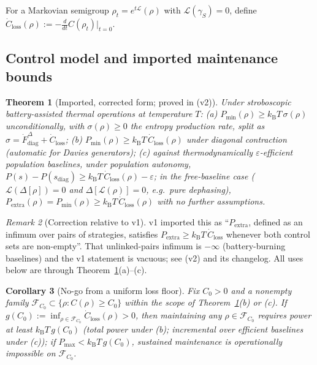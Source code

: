 \documentclass[11pt,a4paper]{article}
\theoremstyle{plain}
\newtheorem{theorem}{Theorem}[section]
\newtheorem{corollary}[theorem]{Corollary}
\theoremstyle{definition}
\theoremstyle{remark}
\newtheorem{remark}[theorem]{Remark}
\newcommand{\kB}{k_{\mathrm{B}}}
\begin{document}
For a Markovian semigroup $\rho_t = e^{t\mathcal{L}}(\rho)$ with
$\mathcal{L}(\gamma_S) = 0$, define $\dot{C}_{\mathrm{loss}}(\rho) :=
-\frac{d}{dt}C(\rho_t)|_{t=0}$.

\subsection{Control model and imported maintenance bounds}

\begin{theorem}[Imported, corrected form; proved in \cite{MaintWork} (v2)]
\label{thm:imported}
Under stroboscopic battery-assisted thermal operations at temperature $T$:
(a) $P_{\min}(\rho) \ge \kB T\,\sigma(\rho)$ unconditionally, with
$\sigma(\rho) \ge 0$ the entropy production rate, split as $\sigma =
\dot{F}^\Delta_{\mathrm{diag}} + \dot{C}_{\mathrm{loss}}$;
(b) $P_{\min}(\rho) \ge \kB T\,\dot{C}_{\mathrm{loss}}(\rho)$ under diagonal
contraction (automatic for Davies generators);
(c) against thermodynamically $\varepsilon$-efficient population baselines,
under population autonomy, $P(s) - P(s_{\mathrm{diag}}) \ge \kB
T\,\dot{C}_{\mathrm{loss}}(\rho) - \varepsilon$; in the free-baseline case
($\mathcal{L}(\Delta[\rho]) = 0$ and $\Delta[\mathcal{L}(\rho)] = 0$, e.g.\
pure dephasing), $P_{\mathrm{extra}}(\rho) = P_{\min}(\rho) \ge \kB
T\,\dot{C}_{\mathrm{loss}}(\rho)$ with no further assumptions.
\end{theorem}

\begin{remark}[Correction relative to v1]\label{rem:importfix}
v1 imported this as ``$P_{\mathrm{extra}}$, defined as an infimum over pairs
of strategies, satisfies $P_{\mathrm{extra}} \ge \kB
T\,\dot{C}_{\mathrm{loss}}$ whenever both control sets are non-empty''. That
unlinked-pairs infimum is $-\infty$ (battery-burning baselines) and the v1
statement is vacuous; see \cite{MaintWork} (v2) and its changelog. All uses
below are through Theorem~\ref{thm:imported}(a)--(c).
\end{remark}

\begin{corollary}[No-go from a uniform loss floor]\label{cor:nogo}
Fix $C_0 > 0$ and a nonempty family $\mathcal{F}_{C_0} \subset \{\rho :
C(\rho) \ge C_0\}$ within the scope of Theorem~\ref{thm:imported}(b) or (c).
If $g(C_0) := \inf_{\rho\in\mathcal{F}_{C_0}} \dot{C}_{\mathrm{loss}}(\rho) >
0$, then maintaining any $\rho \in \mathcal{F}_{C_0}$ requires power at least
$\kB T\, g(C_0)$ (total power under (b); incremental over efficient baselines
under (c)); if $P_{\max} < \kB T\, g(C_0)$, sustained maintenance is
operationally impossible on $\mathcal{F}_{C_0}$.
\end{corollary}
\end{document}
